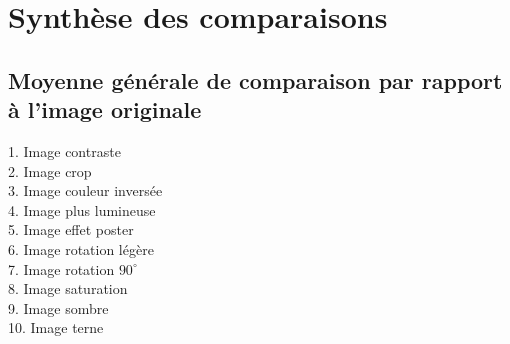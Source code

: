\section{Synthèse des comparaisons}\label{synthese-des-comparaisons}

\begin{table}[htbp]
\centering
{}
\end{table}

\subsection{Moyenne générale de comparaison par rapport à l'image originale}
\begin{bchart}[step=10,max=50,width=7in]
\centering
            \smallskip
            \smallskip
            \smallskip
            \smallskip
            \smallskip
            \smallskip
            \smallskip
            \smallskip
            \smallskip
\end{bchart}

1.  Image contraste \\
2.  Image crop \\
3.  Image couleur inversée \\
4.  Image plus lumineuse \\
5.  Image effet poster \\
6.  Image rotation légère \\
7.  Image rotation $90^{\circ}$ \\
8.  Image saturation \\
9.  Image sombre \\
10. Image terne \\